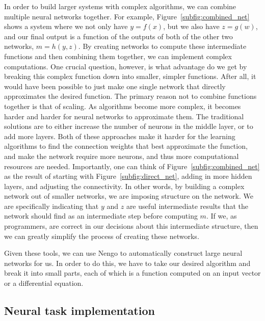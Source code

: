 In order to build larger systems with complex algorithms, we can combine multiple neural networks together.
For example, Figure~\ref{subfig:combined_net} shows a system where we not only have $y=f(x)$, but we also have $z=g(w)$, and our final output is a function of the outputs of both of the other two networks, $m=h(y, z)$.
By creating networks to compute these intermediate functions and then combining them together, we can implement complex computations. 
One crucial question, however, is what advantage do we get by breaking this complex function down into smaller, simpler functions. 
After all, it would have been possible to just make one single network that directly approximates the desired function.
The primary reason not to combine functions together is that of scaling. 
As algorithms become more complex, it becomes harder and harder for neural networks to approximate them. 
The traditional solutions are to either increase the number of neurons in the middle layer, or to add more layers. 
Both of these approaches make it harder for the learning algorithms to find the connection weights that best approximate the function, and make the network require more neurons, and thus more computational resources are needed.
Importantly, one can think of Figure~\ref{subfig:combined_net} as the result of starting with Figure~\ref{subfig:direct_net}, adding in more hidden layers, and adjusting the connectivity. 
In other words, by building a complex network out of smaller networks, we are imposing structure on the network. 
We are specifically indicating that $y$ and $z$ are useful intermediate results that the network should find as an intermediate step before computing $m$. 
If we, as programmers, are correct in our decisions about this intermediate structure, then we can greatly simplify the process of creating these networks.

Given these tools, we can use \ac{Nengo} to automatically construct large neural networks for us. 
In order to do this, we have to take our desired algorithm and break it into small parts, each of which is a function computed on an input vector or a differential equation.

\subsection{Neural task implementation}%
\label{subsec:neural_task_implementation}

